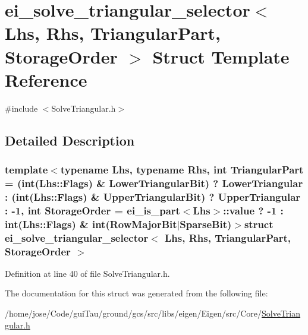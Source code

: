 \hypertarget{structei__solve__triangular__selector}{\section{ei\-\_\-solve\-\_\-triangular\-\_\-selector$<$ Lhs, Rhs, Triangular\-Part, Storage\-Order $>$ Struct Template Reference}
\label{structei__solve__triangular__selector}
}


{\ttfamily \#include $<$Solve\-Triangular.\-h$>$}



\subsection{Detailed Description}
\subsubsection*{template$<$typename Lhs, typename Rhs, int Triangular\-Part = (int(\-Lhs\-::\-Flags) \& Lower\-Triangular\-Bit) ? Lower\-Triangular \-: (int(\-Lhs\-::\-Flags) \& Upper\-Triangular\-Bit) ? Upper\-Triangular \-: -\/1, int Storage\-Order = ei\-\_\-is\-\_\-part$<$\-Lhs$>$\-::value ? -\/1  \-: int(\-Lhs\-::\-Flags) \& int(\-Row\-Major\-Bit$|$\-Sparse\-Bit)$>$struct ei\-\_\-solve\-\_\-triangular\-\_\-selector$<$ Lhs, Rhs, Triangular\-Part, Storage\-Order $>$}



Definition at line 40 of file Solve\-Triangular.\-h.



The documentation for this struct was generated from the following file\-:\begin{DoxyCompactItemize}
\item 
/home/jose/\-Code/gui\-Tau/ground/gcs/src/libs/eigen/\-Eigen/src/\-Core/\hyperlink{_solve_triangular_8h}{Solve\-Triangular.\-h}\end{DoxyCompactItemize}
